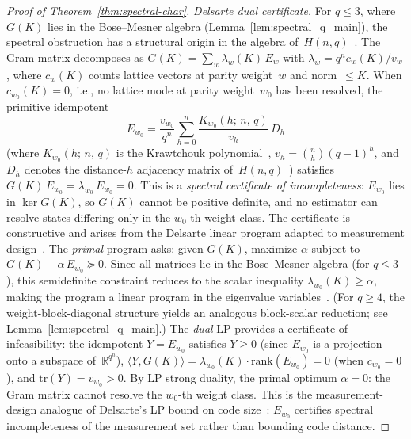\documentclass[twocolumn,prx,aps,superscriptaddress,longbibliography,floatfix]{revtex4-2}
\begin{document}
\begin{proof}[Proof of Theorem~\ref{thm:spectral-char}]
\emph{Delsarte dual certificate.}
For $q \le 3$, where $G(K)$ lies in the Bose--Mesner algebra
(Lemma~\ref{lem:spectral_q_main}),
the spectral obstruction has a structural origin in the
algebra of~$H(n,q)$~\cite{Delsarte1973}.
The Gram matrix decomposes as
$G(K) = \sum_w \lambda_w(K)\, E_w$ with
$\lambda_w = q^n c_w(K)/v_w$, where $c_w(K)$ counts
lattice vectors at parity weight~$w$ and norm~$\le K$.
When $c_{w_0}(K) = 0$, i.e., no lattice mode at
parity weight~$w_0$ has been resolved, the
primitive idempotent
\begin{equation}\label{eq:delsarte-cert}
  E_{w_0} = \frac{v_{w_0}}{q^n}
  \sum_{h=0}^{n}
  \frac{K_{w_0}(h;\, n,\, q)}{v_h}\, D_h
\end{equation}
(where $K_{w_0}(h;\, n,\, q)$ is the Krawtchouk
polynomial~\cite{Delsarte1973}, $v_h = \binom{n}{h}(q{-}1)^h$,
and $D_h$ denotes the distance-$h$ adjacency matrix
of~$H(n,q)$~\cite{BannaiIto1984}) satisfies
$G(K)\, E_{w_0} = \lambda_{w_0}\, E_{w_0} = 0$.
This is a \emph{spectral certificate of incompleteness}:
$E_{w_0}$ lies in $\ker G(K)$, so $G(K)$ cannot be
positive definite, and no estimator can resolve states
differing only in the $w_0$-th weight class.
The certificate is constructive and arises from the
Delsarte linear program adapted to measurement
design~\cite{Delsarte1973,BannaiIto1984}.
The \emph{primal} program asks: given $G(K)$,
maximize $\alpha$ subject to
$G(K) - \alpha\, E_{w_0} \succeq 0$.
Since all matrices lie in the Bose--Mesner algebra
(for $q \le 3$),
this semidefinite constraint reduces to the scalar
inequality $\lambda_{w_0}(K) \ge \alpha$, making the
program a linear program in the eigenvalue
variables~\cite{Delsarte1973}.
(For $q \ge 4$, the weight-block-diagonal structure yields
an analogous block-scalar reduction; see
Lemma~\ref{lem:spectral_q_main}.)  The \emph{dual} LP provides a certificate of
infeasibility: the idempotent $Y = E_{w_0}$ satisfies
$Y \ge 0$ (since $E_{w_0}$ is a projection onto a
subspace of~$\mathbb{R}^{q^n}$), $\langle Y, G(K) \rangle
= \lambda_{w_0}(K) \cdot \mathrm{rank}(E_{w_0}) = 0$
(when $c_{w_0} = 0$), and $\mathrm{tr}(Y) = v_{w_0} > 0$.
By LP strong duality, the primal optimum $\alpha = 0$:
the Gram matrix cannot resolve the $w_0$-th weight class.
This is the measurement-design analogue of
Delsarte's LP bound on code
size~\cite{Delsarte1973,BannaiIto1984}:
$E_{w_0}$ certifies spectral incompleteness of the
measurement set rather than bounding code distance.


\end{proof}
\end{document}

